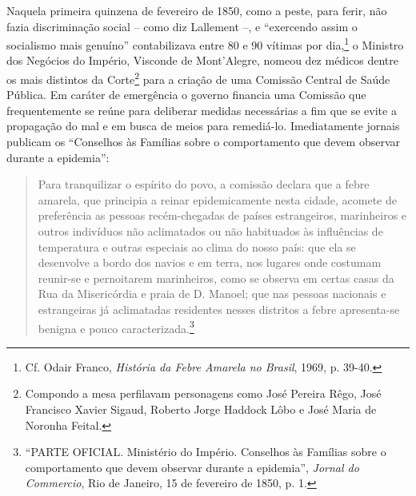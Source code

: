 Naquela primeira quinzena de fevereiro de 1850, como a peste, para
ferir, não fazia discriminação social -- como diz Lallement --, e
``exercendo assim o socialismo mais genuíno'' contabilizava entre 80 e
90 vítimas por dia,\footnote{Cf. Odair Franco, \emph{História da Febre
  Amarela no Brasil}, 1969, p. 39-40.} o Ministro dos Negócios do
Império, Visconde de Mont'Alegre, nomeou dez médicos dentre os mais
distintos da Corte\footnote{Compondo a mesa perfilavam personagens como
  José Pereira Rêgo, José Francisco Xavier Sigaud, Roberto Jorge Haddock
  Lôbo e José Maria de Noronha Feital.} para a criação de uma Comissão
Central de Saúde Pública. Em caráter de emergência o governo financia
uma Comissão que frequentemente se reúne para deliberar medidas
necessárias a fim que se evite a propagação do mal e em busca de meios
para remediá-lo. Imediatamente jornais publicam os ``Conselhos às
Famílias sobre o comportamento que devem observar durante a epidemia'':

\begin{quote}
Para tranquilizar o espírito do povo, a comissão declara que a febre
amarela, que principia a reinar epidemicamente nesta cidade, acomete de
preferência as pessoas recém-chegadas de países estrangeiros,
marinheiros e outros indivíduos não aclimatados ou não habituados às
influências de temperatura e outras especiais ao clima do nosso país:
que ela se desenvolve a bordo dos navios e em terra, nos lugares onde
costumam reunir-se e pernoitarem marinheiros, como se observa em certas
casas da Rua da Misericórdia e praia de D. Manoel; que nas pessoas
nacionais e estrangeiras já aclimatadas residentes nesses distritos a
febre apresenta-se benigna e pouco caracterizada.\footnote{``PARTE
  OFICIAL. Ministério do Império. Conselhos às Famílias sobre o
  comportamento que devem observar durante a epidemia'', \emph{Jornal do
  Commercio}, Rio de Janeiro, 15 de fevereiro de 1850, p. 1.}
\end{quote}

